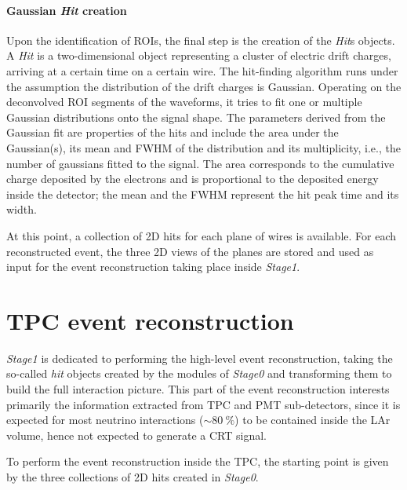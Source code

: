 \paragraph{Gaussian \emph{Hit} creation} Upon the identification of ROIs, the final step is the creation of the \emph{Hit}s objects. A \emph{Hit} is a two-dimensional object representing a cluster of electric drift charges, arriving at a certain time on a certain wire. The hit-finding algorithm runs under the assumption the distribution of the drift charges is Gaussian. Operating on the deconvolved ROI segments of the waveforms, it tries to fit one or multiple Gaussian distributions onto the signal shape. The parameters derived from the Gaussian fit are properties of the hits and include the area under the Gaussian(s), its mean and FWHM of the distribution and its multiplicity, i.e., the number of gaussians fitted to the signal. The area corresponds to the cumulative charge deposited by the electrons and is proportional to the deposited energy inside the detector; the mean and the FWHM represent the hit peak time and its width. 

At this point, a collection of 2D hits for each plane of wires is available. For each reconstructed event, the three 2D views of the planes are stored and used as input for the event reconstruction taking place inside \emph{Stage1}. 

\section{TPC event reconstruction} \label{sec:TPC_reco_gen}

\emph{Stage1} is dedicated to performing the high-level event reconstruction, taking the so-called \emph{hit} objects created by the modules of \emph{Stage0} and transforming them to build the full interaction picture. This part of the event reconstruction interests primarily the information extracted from TPC and PMT sub-detectors, since it is expected for most neutrino interactions (${\sim}\SI{80}{\percent}$) to be contained inside the LAr volume, hence not expected to generate a CRT signal. 

To perform the event reconstruction inside the TPC, the starting point is given by the three collections of 2D hits created in \emph{Stage0}.

